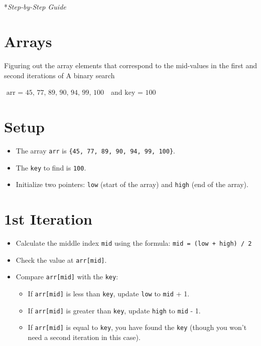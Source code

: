 \documentclass[
  letterpaper,
  DIV=11,
  numbers=noendperiod]{scrreprt}
\makeatletter
\let\oldsubparagraph\subparagraph
\renewcommand{\subparagraph}{
    \@ifstar
      \xxxSubParagraphStar
      \xxxSubParagraphNoStar
  }
\newcommand{\xxxSubParagraphStar}[1]{\oldsubparagraph*{#1}\mbox{}}
\newcommand{\xxxSubParagraphNoStar}[1]{\oldsubparagraph{#1}\mbox{}}
\providecommand{\tightlist}{%
  \setlength{\itemsep}{0pt}\setlength{\parskip}{0pt}}
\makeatother
\begin{document}
\subparagraph*{\texorpdfstring{\emph{Step-by-Step
Guide}}{Step-by-Step Guide}}\label{step-by-step-guide}

\section{Arrays}

Figuring out the array elements that correspond to the mid-values in the
first and second iterations of A binary search

\(\text{ arr = {45, 77, 89, 90, 94, 99, 100} }\) and
\(\text{key = 100}\)

\section{Setup}

\begin{itemize}
\tightlist
\item
  The array \texttt{arr} is
  \texttt{\{45,\ 77,\ 89,\ 90,\ 94,\ 99,\ 100\}}.
\item
  The \texttt{key} to find is \texttt{100}.
\item
  Initialize two pointers: \texttt{low} (start of the array) and
  \texttt{high} (end of the array).
\end{itemize}

\section{1st Iteration}

\begin{itemize}
\item
  Calculate the middle index \texttt{mid} using the formula:
  \texttt{mid\ =\ (low\ +\ high)\ /\ 2}
\item
  Check the value at \texttt{arr{[}mid{]}}.
\item
  Compare \texttt{arr{[}mid{]}} with the \texttt{key}:

  \begin{itemize}
  \tightlist
  \item
    If \texttt{arr{[}mid{]}} is less than \texttt{key}, update
    \texttt{low} to \texttt{mid} + 1.
  \item
    If \texttt{arr{[}mid{]}} is greater than \texttt{key}, update
    \texttt{high} to \texttt{mid} - 1.
  \item
    If \texttt{arr{[}mid{]}} is equal to \texttt{key}, you have found
    the \texttt{key} (though you won't need a second iteration in this
    case).
  \end{itemize}
\end{itemize}
\end{document}
